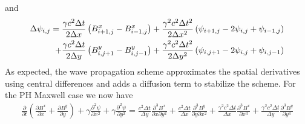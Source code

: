 \documentclass[11pt, reqno]{amsart}
\newcommand{\pfrac}[2]{\frac{\partial #1}{\partial #2}}
\newcommand{\pfracc}[2]{\frac{\partial^2 #1}{\partial #2^2}}
\newcommand{\pfraca}[1]{\frac{\partial}{\partial #1}}
\begin{document}
and
\begin{align}
  \Delta \psi_{i,j} = 
  \frac{\gamma c^2 \Delta t}{2 \Delta x}
  \left(
    B^x_{i+1,j} - B^x_{i-1,j}
  \right)
  +
  \frac{\gamma^2 c^2 \Delta t^2}{2 \Delta x^2}
  \left(
    \psi_{i+1,j} - 2\psi_{i,j} + \psi_{i-1,j}
  \right) \notag \\
  +
  \frac{\gamma c^2 \Delta t}{2 \Delta y}
  \left(
    B^y_{i,j+1} - B^y_{i,j-1}
  \right)
  +
  \frac{\gamma^2 c^2 \Delta t^2}{2 \Delta y^2}
  \left(
    \psi_{i,j+1} - 2\psi_{i,j} + \psi_{i,j-1}
  \right)
\end{align}
As expected, the wave propagation scheme approximates the spatial
derivatives using central differences and adds a diffusion term to
stabilize the scheme. For the PH Maxwell case we now have
\begin{align}
  \pfraca{t}
  \left(
    \pfrac{B^x}{x} + \pfrac{B^y}{y}
  \right)
  +
  \gamma \pfracc{\psi}{x} + \gamma \pfracc{\psi}{y}
  =
  \frac{c^2 \Delta t}{\Delta y}
  \frac{\partial^3B^x}{\partial x \partial y^2}
  +
  \frac{c^2 \Delta t}{\Delta x}
  \frac{\partial^3B^y}{\partial y \partial x^2}
  +
  \frac{\gamma^2 c^2 \Delta t}{\Delta x}
  \frac{\partial^3B^x}{\partial x^3}
  +
  \frac{\gamma^2 c^2 \Delta t}{\Delta y}
  \frac{\partial^3B^y}{\partial y^3}
\end{align}
\end{document}
